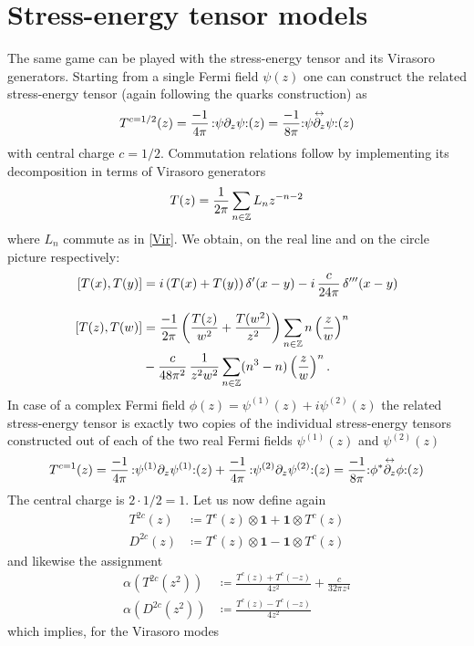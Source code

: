  \section{Stress-energy tensor models}
 The same game can be played with the stress-energy tensor 
 and its Virasoro generators. Starting from a single
 Fermi field $\psi(z)$ one can construct the related stress-energy
 tensor (again following the quarks construction) as
 \[
 T^{c=1/2}(z)=\frac{-1}{4\pi}\,\wick{\psi \partial_z \psi}(z)
 =\frac{-1}{8\pi}\wick{\psi\overset{\leftrightarrow}{\partial_z}
 \psi}(z)
 \]
 with central charge $c=1/2$. Commutation relations follow
 by implementing its decomposition in terms of Virasoro generators 
 \[
 T(z)=\frac{1}{2\pi}\sum_{n\in\Z}L_n z^{-n-2}
 \]
 where $L_n$ commute as in \eqref{Vir}. We obtain, on the
 real line and on the circle picture respectively:
 \begin{align*}
 \comm*{T(x),T(y)}&=i\left(T(x)+T(y)\right)\delta'(x-y)
 -i\,\frac{c}{24\pi}\,\delta'''(x-y)\\[2ex]
 \comm*{T(z),T(w)}&=\frac{-1}{2\pi}\left(\frac{T(z)}{w^2}+
 \frac{T(w^2)}{z^2}\right)\sum_{n\in\Z}n\left(\frac{z}{w}\right)^n\\
 &-\frac{c}{48\pi^2}\,\frac{1}{z^2 w^2}\sum_{n\in\Z}(n^3-n)
 \left(\frac{z}{w}\right)^n.
 \end{align*}
 In case of a complex Fermi field $\phi(z)=\psi^{(1)}(z)
 +i\psi^{(2)}(z)$ the related stress-energy tensor is
 exactly two copies of the individual stress-energy 
 tensors constructed out of each of the two real Fermi fields
 $\psi^{(1)}(z)$ and $\psi^{(2)}(z)$
 \[
 T^{c=1}(z)=\frac{-1}{4\pi}\,\wick{\psi^{(1)}\partial_z \psi^{(1)}}(z)
 +\frac{-1}{4\pi}\,\wick{\psi^{(2)}\partial_z \psi^{(2)}}(z)=
 \frac{-1}{8\pi}\wick{\phi^*\overset{\leftrightarrow}{\partial_z}
 \phi}(z)
 \]
 The central charge is $2\cdot1/2=1$. Let us now define again
 \begin{align*}
 T^{2c}(z)&\coloneqq T^{c}(z)\otimes\bm{1}+\bm{1}\otimes T^{c}(z)\\
 D^{2c}(z)&\coloneqq T^{c}(z)\otimes\bm{1}-\bm{1}\otimes T^{c}(z)
 \end{align*}
 and likewise the assignment
 \begin{align}
 \alpha\left(T^{2c}(z^2)\right)&\coloneqq
 \frac{T^c(z)+T^c(-z)}{4z^2}+\frac{c}{32\pi z^4}\label{T2c}\\[2ex]
 \alpha\left(D^{2c}(z^2)\right)&\coloneqq
 \frac{T^c(z)-T^c(-z)}{4z^2}\label{D2c}
 \end{align}
 which implies, for the Virasoro modes
